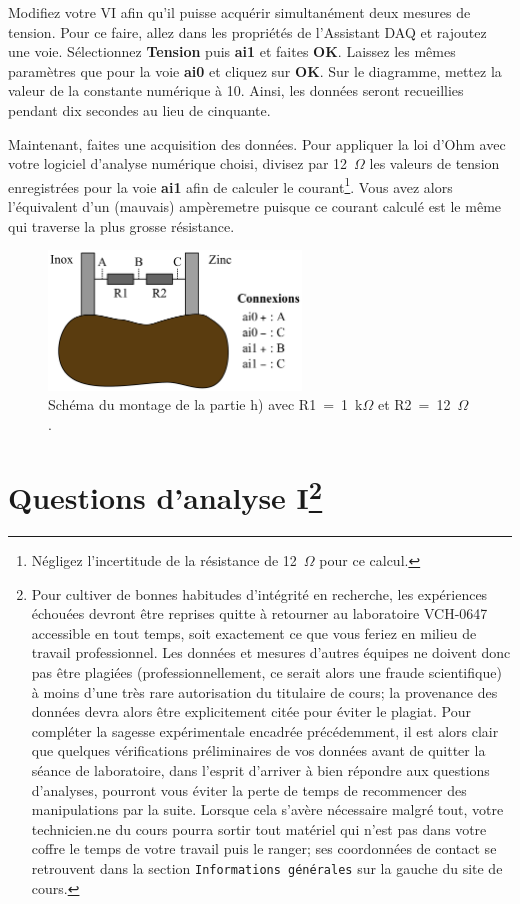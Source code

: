 \documentclass[canadien,12pt,oneside,letterpaper]{article}
\begin{document}
Modifiez votre VI afin qu'il puisse acquérir simultanément deux mesures de tension. Pour ce faire, allez dans les propriétés de l'Assistant DAQ et rajoutez une voie. Sélectionnez \textbf{Tension} puis \textbf{ai1} et faites \textbf{OK}. Laissez les mêmes paramètres que pour la voie \textbf{ai0} et cliquez sur \textbf{OK}. Sur le diagramme, mettez la valeur de la constante numérique à 10. Ainsi, les données seront recueillies pendant dix secondes au lieu de cinquante.

Maintenant, faites une acquisition des données. Pour appliquer la loi d'Ohm avec votre logiciel d'analyse numérique choisi, divisez par 12~$\Omega$ les valeurs de tension enregistrées pour la voie \textbf{ai1} afin de calculer le courant\footnote{Négligez l'incertitude de la résistance de 12~$\Omega$ pour ce calcul.}. Vous avez alors l'équivalent d'un (mauvais) ampèremetre puisque ce courant calculé est le même qui traverse la plus grosse résistance.

\begin{figure}[h]
\centering
\includegraphics[width=0.6\textwidth]{L1-sch-patate}
\caption{\label{L1-sch-patate}Schéma du montage de la partie h) avec R1~=~1~k$\Omega$ et R2~=~12~$\Omega$.}
\end{figure}

\vspace{-0.5cm}
\section[Questions d'analyse I]{Questions d'analyse I\footnote{Pour cultiver de bonnes habitudes d'intégrité en recherche, les expériences échouées devront être reprises quitte à retourner au laboratoire VCH-0647 accessible en tout temps, soit exactement ce que vous feriez en milieu de travail professionnel. Les données et mesures d'autres équipes ne doivent donc pas être plagiées (professionnellement, ce serait alors une fraude scientifique) à moins d'une très rare autorisation du titulaire de cours; la provenance des données devra alors être explicitement citée pour éviter le plagiat. Pour compléter la sagesse expérimentale encadrée précédemment, il est alors clair que quelques vérifications préliminaires de vos données avant de quitter la séance de laboratoire, dans l'esprit d'arriver à bien répondre aux questions d'analyses, pourront vous éviter la perte de temps de recommencer des manipulations par la suite. Lorsque cela s'avère nécessaire malgré tout, votre technicien.ne du cours pourra sortir tout matériel qui n'est pas dans votre coffre le temps de votre travail puis le ranger; ses coordonnées de contact se retrouvent dans la section \texttt{Informations générales} sur la gauche du site de cours.}} \label{sec:grade} 
\end{document}
